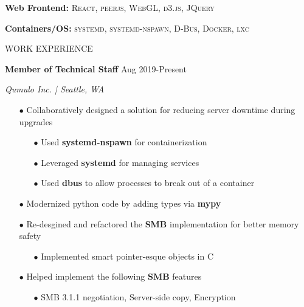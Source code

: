 \documentclass[paper=a4,fontsize=11pt]{scrartcl} %
\newcommand{\sepspace}{\vspace*{1em}}		%
\newcommand{\NewPart}[1]{ \noindent \large \usefont{OT1}{phv}{b}{n}\uppercase{#1} \normalfont \normalsize}
\newcommand{\EducationEntry}[4]{
		\noindent \textbf{#1}     %
			\hfill#2 \par  %
		\noindent \textit{#3} \par        %
		\noindent\hangafter=0 \small #4 %
		\normalsize \par}
\begin{document}
\begin{minipage}[t]{0.2\textwidth}
{  \textbf{Web Frontend:}
  \newline
  \small
    \textsc{React},
    \textsc{peerjs},
    \textsc{WebGL},
    \textsc{d3.js},
    \textsc{JQuery}
  \normalsize
  \newline\newline

  \textbf{Containers/OS:}
  \newline
  \small
    \textsc{systemd},
    \textsc{systemd-nspawn},
    \textsc{D-Bus},
    \textsc{Docker},
    \textsc{lxc}
  \normalsize
}

\end{minipage}
\hspace{0.5em}
\vline
\hspace{1em}
\begin{minipage}[t]{0.75\textwidth}
\sepspace
\NewPart{Work experience}{}

\EducationEntry{Member of Technical Staff}{Aug 2019-Present}{Qumulo Inc. | Seattle, WA}{
\begin{itemize}
  \item[$\bullet$] Collaboratively designed a solution for reducing server downtime during upgrades
    \begin{itemize}
        \item[$\bullet$] Used \textbf{systemd-nspawn} for containerization
        \item[$\bullet$] Leveraged \textbf{systemd} for managing services
        \item[$\bullet$] Used \textbf{dbus} to allow processes to break out of a container
    \end{itemize}
  \item[$\bullet$] Modernized python code by adding types via \textbf{mypy}
  \item[$\bullet$] Re-desgined and refactored the \textbf{SMB} implementation for better memory safety
    \begin{itemize}
      \item[$\bullet$] Implemented smart pointer-esque objects in C
    \end{itemize}
  \item[$\bullet$] Helped implement the following \textbf{SMB} features
    \begin{itemize}
      \item[$\bullet$] SMB 3.1.1 negotiation, Server-side copy, Encryption
    \end{itemize}
\end{itemize}
}


\end{minipage}
\end{document}
